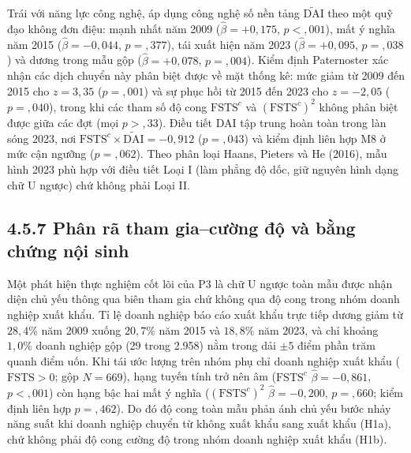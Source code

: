 \documentclass[
  a4paper,
  13pt]{extreport}
\begin{document}
Trái với năng lực công nghệ, áp dụng công nghệ số nền tảng
\(\tilde{\mathrm{DAI}}\) theo một quỹ đạo không đơn điệu: mạnh nhất năm
2009 (\(\hat{\beta} = +0{,}175\), \(p < {,}001\)), mất ý nghĩa năm 2015
(\(\hat{\beta} = -0{,}044\), \(p = {,}377\)), tái xuất hiện năm 2023
(\(\hat{\beta} = +0{,}095\), \(p = {,}038\)) và dương trong mẫu gộp
(\(\hat{\beta} = +0{,}078\), \(p = {,}004\)). Kiểm định Paternoster xác
nhận các dịch chuyển này phân biệt được về mặt thống kê: mức giảm từ
2009 đến 2015 cho \(z = 3{,}35\) (\(p = {,}001\)) và sự phục hồi từ 2015
đến 2023 cho \(z = -2{,}05\) (\(p = {,}040\)), trong khi các tham số độ
cong \(\mathrm{FSTS}^{c}\) và \((\mathrm{FSTS}^{c})^2\) không phân biệt
được giữa các đợt (mọi \(p > {,}33\)). Điều tiết DAI tập trung hoàn toàn
trong làn sóng 2023, nơi
\(\mathrm{FSTS}^{c} \times \tilde{\mathrm{DAI}} = -0{,}912\)
(\(p = {,}043\)) và kiểm định liên hợp M8 ở mức cận ngưỡng
(\(p = {,}062\)). Theo phân loại Haans, Pieters và He (2016), mẫu hình
2023 phù hợp với điều tiết Loại I (làm phẳng độ dốc, giữ nguyên hình
dạng chữ U ngược) chứ không phải Loại II.

\hypertarget{phuxe2n-ruxe3-tham-giacux1b0ux1eddng-ux111ux1ed9-vuxe0-bux1eb1ng-chux1ee9ng-nux1ed9i-sinh}{%
\subsection{4.5.7 Phân rã tham gia--cường độ và bằng chứng nội
sinh}\label{phuxe2n-ruxe3-tham-giacux1b0ux1eddng-ux111ux1ed9-vuxe0-bux1eb1ng-chux1ee9ng-nux1ed9i-sinh}}

Một phát hiện thực nghiệm cốt lõi của P3 là chữ U ngược toàn mẫu được
nhận diện chủ yếu thông qua biên tham gia chứ không qua độ cong trong
nhóm doanh nghiệp xuất khẩu. Tỉ lệ doanh nghiệp báo cáo xuất khẩu trực
tiếp dương giảm từ \(28{,}4\%\) năm 2009 xuống \(20{,}7\%\) năm 2015 và
\(18{,}8\%\) năm 2023, và chỉ khoảng \(1{,}0\%\) doanh nghiệp gộp (29
trong 2.958) nằm trong dải \(\pm 5\) điểm phần trăm quanh điểm uốn. Khi
tái ước lượng trên nhóm phụ chỉ doanh nghiệp xuất khẩu
(\(\mathrm{FSTS} > 0\); gộp \(N = 669\)), hạng tuyến tính trở nên âm
(\(\mathrm{FSTS}^{c}\) \(\hat{\beta} = -0{,}861\), \(p < {,}001\)) còn
hạng bậc hai mất ý nghĩa (\((\mathrm{FSTS}^{c})^2\)
\(\hat{\beta} = -0{,}200\), \(p = {,}660\); kiểm định liên hợp
\(p = {,}462\)). Do đó độ cong toàn mẫu phản ánh chủ yếu bước nhảy năng
suất khi doanh nghiệp chuyển từ không xuất khẩu sang xuất khẩu (H1a),
chứ không phải độ cong cường độ trong nhóm doanh nghiệp xuất khẩu (H1b).
\end{document}
